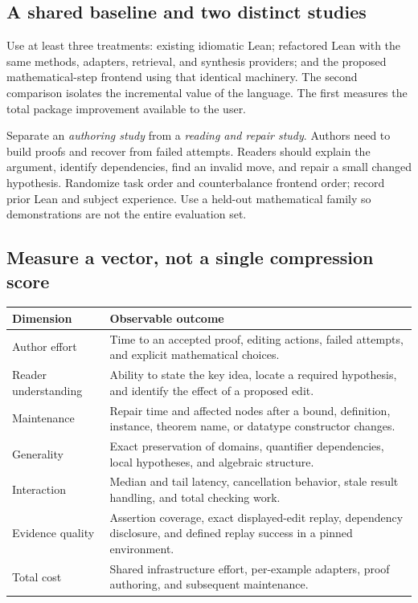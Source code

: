 \documentclass[11pt,letterpaper]{article}
\begin{document}
\subsection{A shared baseline and two distinct studies}
Use at least three treatments: existing idiomatic Lean; refactored Lean with the
same methods, adapters, retrieval, and synthesis providers; and the proposed
mathematical-step frontend using that identical machinery. The second comparison
isolates the incremental value of the language. The first measures the total
package improvement available to the user.

Separate an \emph{authoring study} from a \emph{reading and repair study}. Authors
need to build proofs and recover from failed attempts. Readers should explain the
argument, identify dependencies, find an invalid move, and repair a small changed
hypothesis. Randomize task order and counterbalance frontend order; record prior
Lean and subject experience. Use a held-out mathematical family so demonstrations
are not the entire evaluation set.

\subsection{Measure a vector, not a single compression score}
\begin{tabularx}{\textwidth}{@{}P{.23\textwidth}Y@{}}
\toprule
Dimension & Observable outcome \\
\midrule
Author effort & Time to an accepted proof, editing actions, failed attempts,
  and explicit mathematical choices.\\
Reader understanding & Ability to state the key idea, locate a required hypothesis,
  and identify the effect of a proposed edit.\\
Maintenance & Repair time and affected nodes after a bound, definition, instance,
  theorem name, or datatype constructor changes.\\
Generality & Exact preservation of domains, quantifier dependencies, local
  hypotheses, and algebraic structure.\\
Interaction & Median and tail latency, cancellation behavior, stale result
  handling, and total checking work.\\
Evidence quality & Assertion coverage, exact displayed-edit replay, dependency
  disclosure, and defined replay success in a pinned environment.\\
Total cost & Shared infrastructure effort, per-example adapters, proof authoring,
  and subsequent maintenance.\\
\bottomrule
\end{tabularx}
\end{document}
